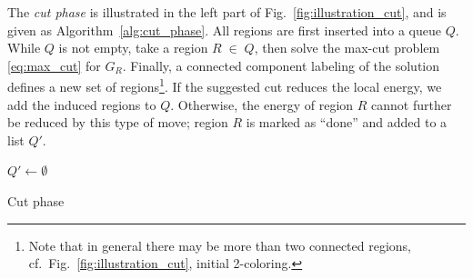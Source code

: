 The \emph{cut phase} is illustrated in the left
part of Fig.~\ref{fig:illustration_cut}, and is given as
Algorithm~\ref{alg:cut_phase}.
%
All regions are first inserted into a queue $Q$.
While $Q$ is not empty, take a region $R\;\in\;Q$,
then solve the max-cut problem \eqref{eq:max_cut} for $G_R$.
%
Finally, a connected component labeling of the solution defines a new set of
regions\footnote{%
Note that in general there may be more than two connected regions,
cf.~Fig.~\ref{fig:illustration_cut}, initial 2-coloring.
}.
%
If the suggested cut reduces the local energy, we add the induced regions
to $Q$.
%
Otherwise, the energy of region $R$ cannot further be reduced by this
type of move; region $R$ is marked as ``done'' and added to a list $Q'$.

\begin{algorithm}
\ifx\DontPrintSemicolon\undefined
\else
\DontPrintSemicolon
\fi
{}
%
$Q' \leftarrow \emptyset$\;
%
\caption{Cut phase\label{alg:cut_phase}}
\end{algorithm}

